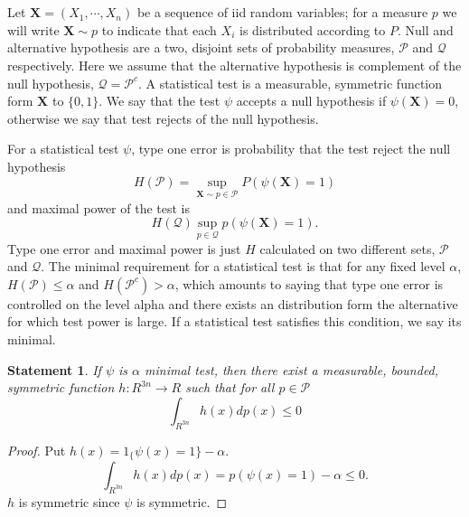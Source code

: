\documentclass{article}
\title{}
\author{KC}
\date{}
\newtheorem{statement}{Statement}
\begin{document}
\maketitle

\section{}


Let   $\mathbf X = (X_1,\cdots, X_n)$ be a sequence of iid random variables; for a measure $p$ we will write $\mathbf X \sim p$ to indicate that each $X_i$ is distributed according to  $P$.  Null and alternative hypothesis are a two, disjoint sets of probability measures, $\mathcal{P}$ and $\mathcal{Q}$ respectively. Here we assume that the alternative hypothesis is complement of the null hypothesis,  $\mathcal Q = \mathcal{P}^c$.  A statistical test is a measurable, symmetric function form  $\mathbf X$ to $\{0,1\}$. We say that the test $\psi$ accepts a null hypothesis if $\psi(\mathbf X)=0$, otherwise we say that test rejects of the null hypothesis. 

For a statistical test $\psi$, type one error is probability that the test reject the null hypothesis 
\[
 H(\mathcal{P}) =  \sup_{\mathbf{X} \sim p \in \mathcal{P} }   P( \psi(\mathbf X) =1 )
\]
and maximal power of the test is 
\[
H(\mathcal{Q}) \sup_{p \in \mathcal{Q} }   p( \psi(\mathbf X) =1 ).
\]
 Type one error and maximal power is just $H$  calculated on two different sets,  $\mathcal{P}$ and $\mathcal{Q}$. The minimal requirement for a statistical test is that for any fixed level $\alpha$, $H(\mathcal{P}) \leq \alpha$ and $H(\mathcal{P}^c) > \alpha$, which amounts to saying that type one error is controlled on the level alpha and there exists an distribution form the alternative for which test power is large. If a statistical test satisfies this condition, we say its minimal. 

\begin{statement}
If $\psi$ is $\alpha$ minimal test, then there exist a measurable, bounded, symmetric function $h: R^{3n} \to R$ such that for all $p \in \mathcal{P}$ 
\[
 \int_{R^{3n}} h(x) dp(x)  \leq 0
\]
\end{statement}

\begin{proof}
 Put $h(x) = 1_\{ \psi(x) =1 \} - \alpha$. 
 \[
  \int_{R^{3n}} h(x) dp(x) = p( \psi(x) =1) - \alpha \leq 0.
 \]
$h$ is symmetric since $\psi$ is symmetric. 
\end{proof}
\end{document}
